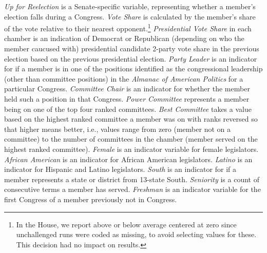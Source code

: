 \documentclass[12pt]{article}
\begin{document}
\textit{Up for Reelection} is a Senate-specific variable, representing whether a member's election falls during a Congress.
\textit{Vote Share} is calculated by the member's share of the vote relative to their nearest opponent.\footnote{\doublespacing\normalsize In the House, we report above or below average centered at zero since unchallenged runs were coded as missing, to avoid selecting values for these. This decision had no impact on results.}  \textit{Presidential Vote Share} in each chamber is an indication of Democrat or Republican (depending on who the member caucused with) presidential candidate 2-party vote share in the previous election based on the previous presidential election.  \textit{Party Leader} is an indicator for if a member is in one of the positions identified as the congressional leadership (other than committee positions) in the \textit{Almanac of American Politics} for a particular Congress. \textit{Committee Chair} is an indicator for whether the member held such a position in that Congress.  \textit{Power Committee} represents a member being on one of the top four ranked committees.  \textit{Best Committee} takes a value based on the highest ranked committee a member was on with ranks reversed so that higher means better, i.e., values range from zero (member not on a committee) to the number of committees in the chamber (member served on the highest ranked committee).  \textit{Female} is an indicator variable for female legislators.  \textit{African American} is an indicator for African American legislators.  \textit{Latino} is an indicator for Hispanic and Latino legislators.  \textit{South} is an indicator for if a member represents a state or district from 13-state South.  \textit{Seniority} is a count of consecutive terms a member has served.  \textit{Freshman} is an indicator variable for the first Congress of a member previously not in Congress.
\end{document}
